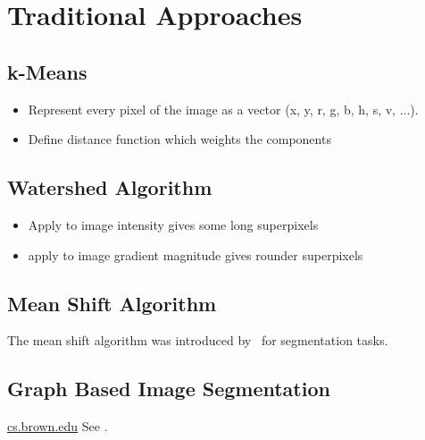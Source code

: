 \section{Traditional Approaches}\label{sec:traditional-approaches}

\subsection{k-Means}\label{subsec:k-means}

\begin{itemize}
    \item Represent every pixel of the image as a vector (x, y, r, g, b, h, s,
          v, ...).
    \item Define distance function which weights the components
\end{itemize}


\subsection{Watershed Algorithm}\label{subsec:watershed}

\begin{itemize}
    \item Apply to image intensity gives some long superpixels
    \item apply to image gradient magnitude gives rounder superpixels
\end{itemize}


\subsection{Mean Shift Algorithm}\label{subsec:mean-shift}
The mean shift algorithm was introduced by~\cite{comaniciu2002mean} for
segmentation tasks.


\subsection{Graph Based Image Segmentation}\label{subsec:graph-based-image-segmentation}
\href{http://cs.brown.edu/~pff/segment/}{cs.brown.edu}
See \cite{felzenszwalb2004efficient}.
